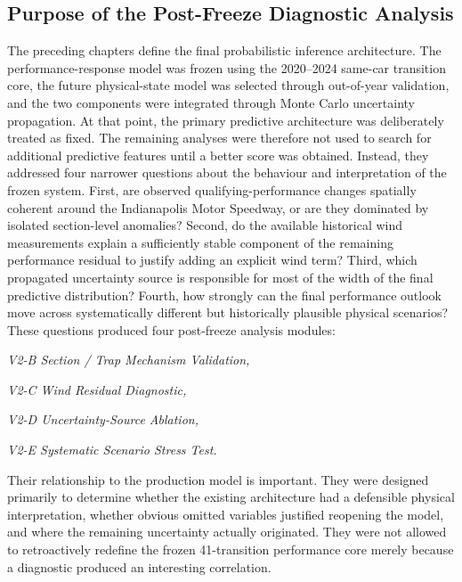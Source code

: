 \subsection{Purpose of the Post-Freeze Diagnostic Analysis}
The preceding chapters define the final probabilistic inference architecture. The performance-response model was frozen using the 2020--2024 same-car transition core, the future physical-state model was selected through out-of-year validation, and the two components were integrated through Monte Carlo uncertainty propagation. At that point, the primary predictive architecture was deliberately treated as fixed. The remaining analyses were therefore not used to search for additional predictive features until a better score was obtained. Instead, they addressed four narrower questions about the behaviour and interpretation of the frozen system. First, are observed qualifying-performance changes spatially coherent around the Indianapolis Motor Speedway, or are they dominated by isolated section-level anomalies? Second, do the available historical wind measurements explain a sufficiently stable component of the remaining performance residual to justify adding an explicit wind term? Third, which propagated uncertainty source is responsible for most of the width of the final predictive distribution? Fourth, how strongly can the final performance outlook move across systematically different but historically plausible physical scenarios? These questions produced four post-freeze analysis modules:

\begin{center}\textit{V2-B Section / Trap Mechanism Validation,}\end{center}

\begin{center}\textit{V2-C Wind Residual Diagnostic,}\end{center}

\begin{center}\textit{V2-D Uncertainty-Source Ablation,}\end{center}

\begin{center}\textit{V2-E Systematic Scenario Stress Test.}\end{center}

Their relationship to the production model is important. They were designed primarily to determine whether the existing architecture had a defensible physical interpretation, whether obvious omitted variables justified reopening the model, and where the remaining uncertainty actually originated. They were not allowed to retroactively redefine the frozen 41-transition performance core merely because a diagnostic produced an interesting correlation.

